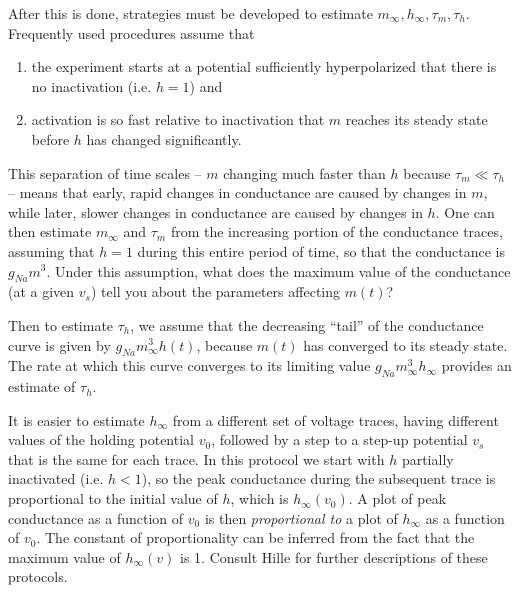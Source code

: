 \documentclass [11pt]{article}
\numberwithin{exercise}{section}
\begin{document}
After this is done, strategies must be developed to estimate 
$m_\infty,h_\infty,\tau_m,\tau_h$. Frequently used procedures 
assume that 
\begin{enumerate}
\item the experiment starts at a potential sufficiently hyperpolarized that there is
no inactivation (i.e. $h=1$) and 
\item activation is so fast relative to inactivation that $m$ reaches its steady state before $h$ has changed 
significantly. 
\end{enumerate}
This separation of time scales -- $m$ changing much faster than $h$ because $\tau_m \ll \tau_h$  
-- means that early, rapid changes in conductance are caused by changes in $m$, while later, slower 
changes in conductance are caused by changes in $h$. One can then estimate $m_\infty$ and $\tau_m$ from the increasing 
portion of the conductance traces, assuming that $h=1$ during this entire period
of time, so that the conductance is $g_{Na}m^3$. Under this assumption, what does the maximum value
of the conductance (at a given $v_s$) tell you about the parameters affecting $m(t)$? 

Then to estimate $\tau_h$, we assume that the decreasing ``tail'' of the conductance curve 
is given by $g_{Na}m_{\infty}^3 h(t)$, because $m(t)$ has converged to its steady state. 
The rate at which this curve converges to its limiting value $g_{Na}m_{\infty}^3 h_{\infty}$
provides an estimate of $\tau_h$. 

It is easier to estimate $h_{\infty}$ from a different set of voltage traces, having   
different values of the holding potential $v_0$, followed by a step to 
a step-up potential $v_s$ that is the same for each trace. 
In this protocol we start with $h$ partially inactivated (i.e. $h<1$), so the peak 
conductance during the subsequent trace is proportional to the initial value of $h$, which is 
$h_{\infty}(v_0).$ A plot of peak conductance as a function of $v_0$ is then \textit{proportional to} a plot
of $h_{\infty}$ as a function of $v_0$. The constant of proportionality can be inferred from
the fact that the maximum value of $h_{\infty}(v)$ is 1. Consult Hille for further 
descriptions of these protocols.
\end{document}
